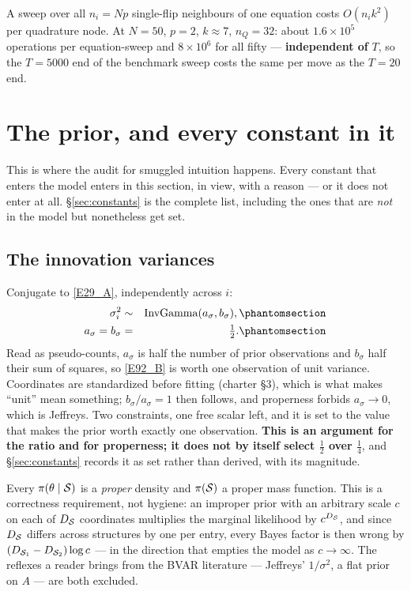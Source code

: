 \begin{corollary}\label{cor:buys}
A sweep over all $n_i=Np$ single-flip neighbours of one equation costs $O(n_ik^2)$
per quadrature node. At $N=50$, $p=2$, $k\approx 7$, $n_Q=32$: about
$1.6\times10^5$ operations per equation-sweep and $8\times10^6$ for all fifty ---
\textbf{independent of} $T$, so the $T=5000$ end of the benchmark sweep costs the
same per move as the $T=20$ end.
\end{corollary}


\section{The prior, and every constant in it}\label{sec:prior}

This is where the audit for smuggled intuition happens. Every constant that enters
the model enters in this section, in view, with a reason --- or it does not enter at
all. \S\ref{sec:constants} is the complete list, including the ones that are
\emph{not} in the model but nonetheless get set.

\subsection{The innovation variances}

Conjugate to \eqref{E29_A}, independently across $i$:
\begin{eqnarray}
\sigma_i^2 &\sim& \operatorname{InvGamma}(a_\sigma,b_\sigma),
  \Elabel{E-92A}{E92_A} \\
a_\sigma = b_\sigma &=& \tfrac12.
  \Elabel{E-92B}{E92_B}
\end{eqnarray}
Read as pseudo-counts, $a_\sigma$ is half the number of prior observations and
$b_\sigma$ half their sum of squares, so \eqref{E92_B} is worth one observation of unit
variance. Coordinates are standardized before fitting (charter \S3), which is what
makes ``unit'' mean something; $b_\sigma/a_\sigma=1$ then follows, and properness
forbids $a_\sigma\to0$, which is Jeffreys. Two constraints, one free scalar left, and
it is set to the value that makes the prior worth exactly one observation.
\textbf{This is an argument for the ratio and for properness; it does not by itself
select $\frac12$ over $\frac14$}, and \S\ref{sec:constants} records it as set rather
than derived, with its magnitude.

\begin{assumption}\label{ass:proper}
Every $\pi(\theta\mid\mathcal{S})$ is a \emph{proper} density and $\pi(\mathcal{S})$ a proper mass
function. This is a correctness requirement, not hygiene: an improper prior with an
arbitrary scale $c$ on each of $D_{\mathcal{S}}$ coordinates multiplies the marginal likelihood
by $c^{D_{\mathcal{S}}}$, and since $D_{\mathcal{S}}$ differs across structures by one per entry, every
Bayes factor is then wrong by $(D_{\mathcal{S}_1}-D_{\mathcal{S}_2})\log c$ --- in the direction that
empties the model as $c\to\infty$. The reflexes a reader brings from the BVAR
literature --- Jeffreys' $1/\sigma^2$, a flat prior on $A$ --- are both excluded.
\end{assumption}

